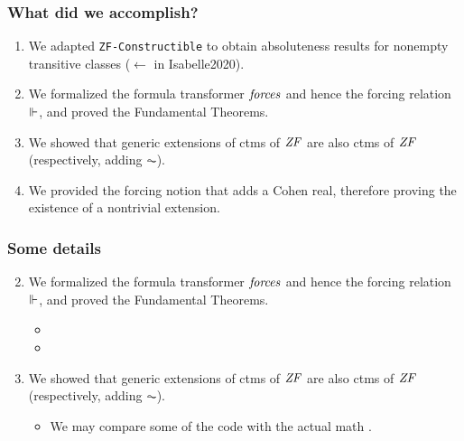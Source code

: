 \documentclass[english]{beamer}
\begin{document}
\begin{frame}
  \frametitle{What did we accomplish?}
  \begin{shadowblock}{}
    \begin{enumerate}
    \item<1-> We adapted \texttt{ZF-Constructible} to obtain
      absoluteness results for nonempty transitive classes ($\leftarrow$
      \alert{in Isabelle2020}).

    \item<3-> We formalized the formula transformer $\mathit{forces}$ and
      hence the forcing relation $\Vdash$, and proved the Fundamental
      Theorems.
    \item<4-> We showed that generic extensions of ctms of $\mathit{ZF}$ are also
      ctms of $\mathit{ZF}$ (respectively, adding $\AC$).
    \item<5-> We provided the forcing notion that adds a Cohen real,
      therefore proving the existence of a nontrivial extension.
    \end{enumerate}
  \end{shadowblock}
\end{frame}

\begin{frame}
  \frametitle{Some details}
  \begin{enumerate}\setcounter{enumi}{1}
  \item<+-> We formalized the formula transformer $\mathit{forces}$ and
    hence the forcing relation $\Vdash$, and proved the Fundamental
    Theorems.
    \begin{itemize}
    \item<+-> 
    \item<+-> 
    \end{itemize}
  \item<+-> We showed that generic extensions of ctms of $\mathit{ZF}$ are also
    ctms of $\mathit{ZF}$ (respectively, adding $\AC$).
    \begin{itemize}
    \item<+-> We may compare some of the code with the actual
      math \citep{kunen2011set}.
    \end{itemize}
  \end{enumerate}
\end{frame}

\end{document}
